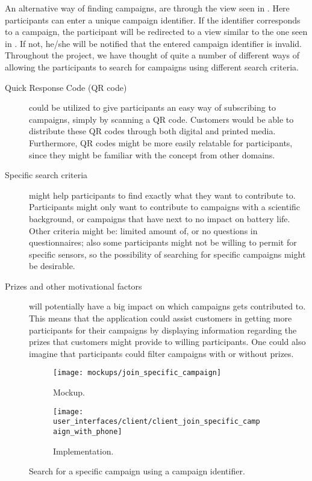 An alternative way of finding campaigns, are through the view seen in . Here participants can enter a unique campaign identifier. If the identifier corresponds to a campaign, the participant will be redirected to a view similar to the one seen in . If not, he/she will be notified that the entered campaign identifier is invalid. Throughout the project, we have thought of quite a number of different ways of allowing the participants to search for campaigns using different search criteria.

\begin{description}
 	\item[Quick Response Code (QR code)] could be utilized to give participants an easy way of subscribing to campaigns, simply by scanning a QR code. Customers would be able to distribute these QR codes through both digital and printed media. Furthermore, QR codes might be more easily relatable for participants, since they might be familiar with the concept from other domains.

 	\item[Specific search criteria] might help participants to find exactly what they want to contribute to. Participants might only want to contribute to campaigns with a scientific background, or campaigns that have next to no impact on battery life. Other criteria might be: limited amount of, or no questions in questionnaires; also some participants might not be willing to permit for specific sensors, so the possibility of searching for specific campaigns might be desirable.

 	\item[Prizes and other motivational factors] will potentially have a big impact on which campaigns gets contributed to. This means that the application could assist customers in getting more participants for their campaigns by displaying information regarding the prizes that customers might provide to willing participants. One could also imagine that participants could filter campaigns with or without prizes. 
\end{description} 


\begin{figure}[!htbp]
\begin{subfigure}[!t]{.48\textwidth}
  \centering
  \texttt{[image: mockups/join\_specific\_campaign]}
  \caption{Mockup.}
  \label{fig:mockup_specific_campaign}
\end{subfigure}%
\begin{subfigure}[!t]{.52\textwidth}
  \centering
  \texttt{[image: user\_interfaces/client/client\_join\_specific\_campaign\_with\_phone]}
  \caption{Implementation.}
  \label{fig:implementation_specific_campaign}
\end{subfigure}
\caption{Search for a specific campaign using a campaign identifier.}
\label{fig:specific_campaign}
\end{figure}
\FloatBarrier

